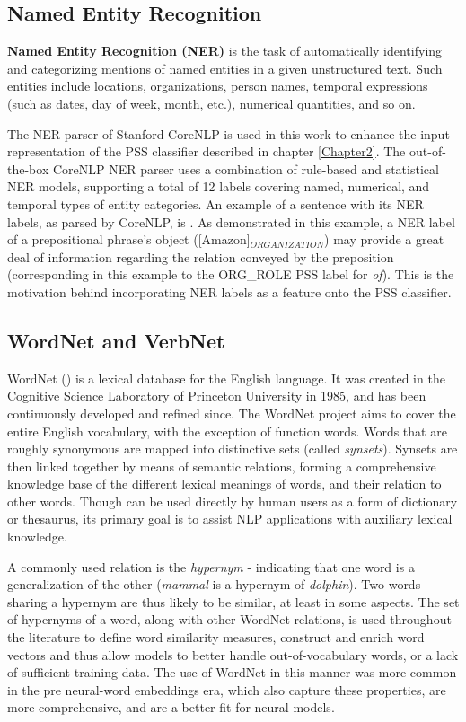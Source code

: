 \subsection{Named Entity Recognition}
\textbf{Named Entity Recognition (NER)} is the task of automatically identifying and categorizing mentions of named entities in a given unstructured text. Such entities include locations, organizations, person names, temporal expressions (such as dates, day of week, month, etc.), numerical quantities, and so on.

The NER parser of Stanford CoreNLP is used in this work to enhance the input representation of the PSS classifier described in chapter \ref{Chapter2}. The out-of-the-box CoreNLP NER parser uses a combination of rule-based and statistical NER models, supporting a total of 12 labels covering named, numerical, and temporal types of entity categories. An example of a sentence with its NER labels, as parsed by CoreNLP, is . As demonstrated in this example, a NER label of a prepositional phrase's object ([Amazon]$_{ORGANIZATION}$) may provide a great deal of information regarding the relation conveyed by the preposition (corresponding in this example to the ORG\_ROLE PSS label for \emph{of}). This is the motivation behind incorporating NER labels as a feature onto the PSS classifier.

\subsection{WordNet and VerbNet} \label{sec:wordnet}

WordNet (\cite{wordnet}) is a lexical database for the English language. It was created in the Cognitive Science Laboratory of Princeton University in 1985, and has been continuously developed and refined since. The WordNet project aims to cover the entire English vocabulary, with the exception of function words.  Words that are roughly synonymous are mapped into distinctive sets (called \emph{synsets}). Synsets are then linked together by means of semantic relations, forming a comprehensive knowledge base of the different lexical meanings of words, and their relation to other words. Though can be used directly by human users as a form of dictionary or thesaurus, its primary goal is to assist NLP applications with auxiliary lexical knowledge. 

A commonly used relation is the \emph{hypernym} - indicating that one word is a generalization of the other (\emph{mammal} is a hypernym of \emph{dolphin}). Two words sharing a hypernym are thus likely to be similar, at least in some aspects. The set of hypernyms of a word, along with other WordNet relations, is used throughout the literature to define word similarity measures, construct and enrich word vectors and thus allow models to better handle out-of-vocabulary words, or a lack of sufficient training data. The use of WordNet in this manner was more common in the pre neural-word embeddings era, which also capture these properties, are more comprehensive, and are a better fit for neural models.


